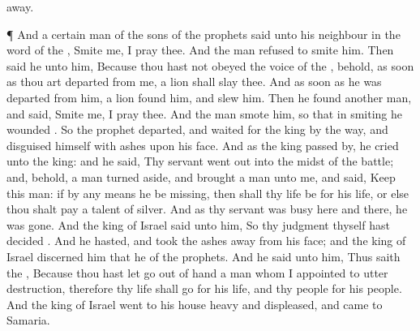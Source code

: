 {away.
\par }{\PP {}¶ And a
certain
man of the
sons of the
prophets
said unto his
neighbour in the
word of the
{},
Smite me, I pray thee. And the
man
refused to
smite him.
Then
said he unto him, Because thou hast not
obeyed the
voice of the
{}, behold, as soon as thou art
departed from me, a
lion shall
slay thee. And as soon as he was
departed from
him, a
lion
found him, and
slew him.
Then he
found
another
man, and
said,
Smite me, I pray thee. And the
man
smote him, so that in
smiting he
wounded
{}.
So the
prophet
departed, and
waited for the
king by the
way, and
disguised himself with
ashes upon his
face.
And as the
king passed
by, he
cried unto the
king: and he
said, Thy
servant went
out into the
midst of the
battle; and, behold, a
man turned
aside, and
brought a
man unto me, and
said,
Keep this
man: if by any
means he be
missing, then shall thy
life be for his
life, or else thou shalt
pay a
talent of
silver.
And as thy
servant was
busy here and there, he was
gone. And the
king of
Israel
said unto him, So
{} thy
judgment
{} thyself hast
decided
{}.
And he
hasted, and took the
ashes
away from his
face; and the
king of
Israel
discerned him that he
{} of the
prophets.
And he
said unto him, Thus
saith the
{}, Because thou hast let
go out of
{}
hand a
man whom I appointed to utter
destruction, therefore thy
life shall go for his
life, and thy
people for his
people.
And the
king of
Israel
went to his
house
heavy and
displeased, and
came to
Samaria.

}
